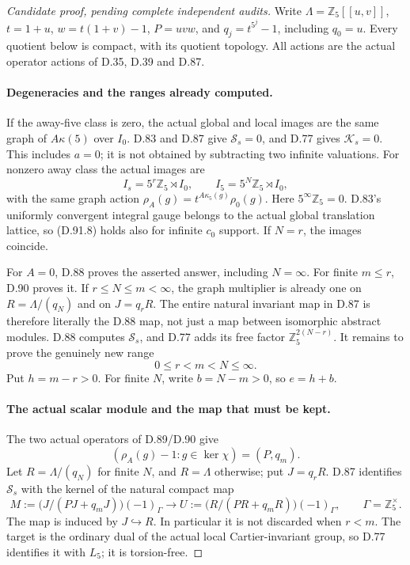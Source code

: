 \begin{proof}[Candidate proof, pending complete independent audits]
Write \(\Lambda=\mathbb Z_5[[u,v]]\), \(t=1+u\),
\(w=t(1+v)-1\), \(P=uvw\), and \(q_j=t^{5^j}-1\),
including \(q_0=u\). Every quotient below is compact,
with its quotient topology. All actions are the actual
operator actions of D.35, D.39 and D.87.

\paragraph{Degeneracies and the ranges already computed.}
If the away-five class is zero, the actual global and local
images are the same graph of \(A\kappa(5)\) over \(I_0\).
D.83 and D.87 give \(\mathcal S_s=0\), and D.77 gives
\(\mathcal K_s=0\). This includes \(a=0\); it is not
obtained by subtracting two infinite valuations.
For nonzero away class the actual images are
\[
 I_s=5^r\mathbb Z_5\rtimes I_0,\qquad
 I_5=5^N\mathbb Z_5\rtimes I_0,
                                                               \tag{D.91.8}
\]
with the same graph action
\(\rho_A(g)=t^{A\kappa_5(g)}\rho_0(g)\).
Here \(5^\infty\mathbb Z_5=0\). D.83's uniformly
convergent integral gauge belongs to the actual global
translation lattice, so (D.91.8) holds also for infinite
\(c_0\) support. If \(N=r\), the images coincide.

For \(A=0\), D.88 proves the asserted answer, including
\(N=\infty\). For finite \(m\le r\), D.90 proves it.
If \(r\le N\le m<\infty\), the graph multiplier is
already one on \(R=\Lambda/(q_N)\) and on \(J=q_rR\).
The entire natural invariant map in D.87 is therefore
literally the D.88 map, not just a map between isomorphic
abstract modules. D.88 computes \(\mathcal S_s\), and
D.77 adds its free factor \(\mathbb Z_5^{2(N-r)}\).
It remains to prove the genuinely new range
\[
                 0\le r<m<N\le\infty.
                                                               \tag{D.91.9}
\]
Put \(h=m-r>0\). For finite \(N\), write \(b=N-m>0\),
so \(e=h+b\).

\paragraph{The actual scalar module and the map that must be kept.}
The two actual operators of D.89/D.90 give
\[
       (\rho_A(g)-1:g\in\ker\chi)=(P,q_m).
                                                               \tag{D.91.10}
\]
Let \(R=\Lambda/(q_N)\) for finite \(N\), and \(R=\Lambda\)
otherwise; put \(J=q_rR\). D.87 identifies \(\mathcal S_s\)
with the kernel of the natural compact map
\[
 M:=\bigl(J/(PJ+q_mJ)\bigr)(-1)_\Gamma
       \longrightarrow
 U:=\bigl(R/(PR+q_mR)\bigr)(-1)_\Gamma,
 \qquad \Gamma=\mathbb Z_5^\times.
                                                               \tag{D.91.11}
\]
The map is induced by \(J\hookrightarrow R\).
In particular it is not discarded when \(r<m\).
The target is the ordinary dual of the actual local
Cartier-invariant group, so D.77 identifies it with
\(L_5\); it is torsion-free.


\end{proof}
